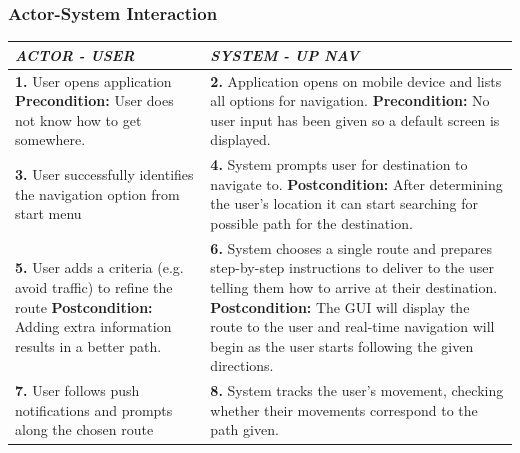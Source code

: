 \documentclass[a4paper,12pt]{article}
\begin{document}
\newpage
\subsubsection{Actor-System Interaction}
\begin{table}[!htbp]
\footnotesize
\label{tab:table 3.2.3}
\bgroup
\def\arraystretch{1.3}
\begin{tabular}{|L|L|}
\hline
\textbf{\textit{ACTOR - USER}} & \textbf{\textit{SYSTEM - UP NAV}}
\\
\hline
\textbf{1.} User opens application \linebreak \linebreak
\textbf{Precondition:} User does not know how to get somewhere. & \textbf{2.} Application opens on mobile device and lists all options for navigation. \linebreak \linebreak
\textbf{Precondition:} No user input has been given so a default screen is displayed.
\\
\hline
\textbf{3.} User successfully identifies the navigation option from start menu \linebreak \linebreak
& \textbf{4.} System prompts user for destination to navigate to. \linebreak \linebreak
\textbf{Postcondition:} After determining the user's location it can start searching for possible path for the destination.
\\
\hline
\textbf{5.} User adds a criteria (e.g. avoid traffic) to refine the route \linebreak \linebreak
\textbf{Postcondition:} Adding extra information results in a better path.
& \textbf{6.} System chooses a single route and prepares step-by-step instructions to deliver to the user telling them how to arrive at their destination. \linebreak \linebreak 
\textbf{Postcondition:} The GUI will display the route to the user and real-time navigation will begin as the user starts following the given directions.
\\
\hline
\textbf{7.} User follows push notifications and prompts along the chosen route \linebreak
& \textbf{8.} System tracks the user's movement, checking whether their movements correspond to the path given. \linebreak
\\

\end{tabular}
\end{table}
\end{document}
